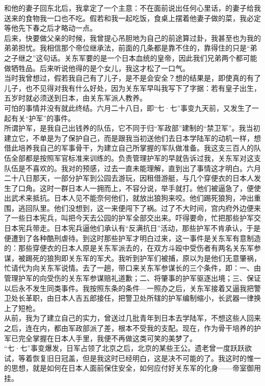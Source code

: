 和他的妻子回东北后，我拿定了一个主意：不在面前说出任何心里话，的妻子给我送来的食物我一口也不吃。假若和我一起吃饭，食桌上摆着他妻子做的菜，我必定等他先下春之后才略动一点。\\

后来，快要做父亲的时候，我曾提心吊胆地为自己的前途算过卦，我甚至也为我的弟弟担忧。我相信那个帝位继承法，前面的几条都是靠不住的，靠得住的只是“弟之子继之”这句话。关东军要的是一个日本血统的皇帝，因此我们兄弟两个都可能做牺牲品。后来听说他得的是个女儿，我这才松了一口气。\\

当时我曾想过，假若我自己有了儿子，是不是会安全？想的结果是，即使真的有了儿子，也不见得对我有什么好处，因为关东军早叫我写下了字据：若有皇子出生，五岁时就必须送到日本，由关东军派人教养。\\

可怕的事情并没有就此终结。六月二十八日，即“七·七”事变九天前，又发生了一起有关“护军”的事件。\\

所谓护军，是我自己出钱养的队伍，它不同于归“军政部”建制的“禁卫军”。我当初建立它，不单是为了保护自己，而是跟我当初送他们去日本学陆军的动机一样，想借此培养我自己的军事骨干，为建立自己所掌握的军队做准备。我这支三百人的队伍全部都是按照军官标准来训练的。负责管理护军的早就告诉过我，关东军对这支队伍是不喜欢的。我对的预感，过去一直未能理解，直到出了事情这才明白。六月二十八日那天，一部分护军到公园去游玩，因租借游艇，与几个穿便衣的日本人发生了口角。这时一群日本人一拥而上，不容分说，举手就打。他们被逼急了，便使出武术来抵抗。日本人见不能奈何他们，就放出狼狗来咬。他们踢死狼狗，冲出重围，逃回队里。他们没想到，这一来便闯下了祸。过了不大时间，宫内府外边便来了一些日本宪兵，叫把今天去公园的护军全部交出来。吓得要命，忙把那些护军交日本宪兵带走。日本宪兵逼他们承认有“反满抗日”活动，那些护军不肯承认，于是便遭到了各种酷刑虐待。到这时那些护军才明白过来，这一事件是关东军有意制造的：那些穿便衣的日本人原是关东军派去的，在双方斗殴中受伤者有两名关东军参谋，被踢死的狼狗即关东军的军犬。我听到护军们被捕，原以为是他们无意肇祸，忙请代为向关东军说情。去了一趟，带口来关东军参谋长的三个条件，即：一、由管理护军的向受伤的关东军参谋赔礼道歉；二、将肇事的护军驱逐出境；三、保证以后永不发生同类事件。我按照东条的条件—一照办之后，关东军接着又逼我把警卫处长革职，由日本人吉五郎接任，把警卫处所辖的护军编制缩小，长武器一律换上了短枪。\\

从前，我为了建立自己的实力，曾送过几批青年到日本去学陆军，不想这些人回来之后，连在内，都由军政部派了差，根本不受我的支配。现在，作为骨干培养的护军已完全掌握在日本人手里，我便不再做这类可笑的美梦了。\\

“七·七”事变爆发，日军占领了北京之后，北京的某些王公。遗老曾一度跃跃欲试，等着恢复旧日冠盖，但是我这时已经明白，这是决不可能的了。我这时的惟一的思想，就是如何在日本人面前保住安全，如何应付好关东军的化身——帝室御用挂。
